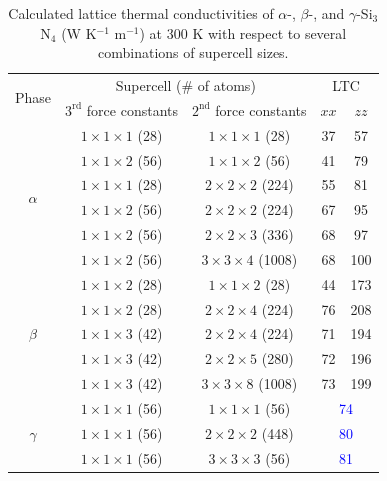 \documentclass[twocolumn,amsmath,amssymb,a4paper,prb,superscriptaddress,floatfix]{revtex4-1}
\begin{document}
\begin{table}[ht]
        \caption{\label{table:LTC} Calculated lattice thermal conductivities
 of $\alpha$-, $\beta$-, and $\gamma$-Si$_3$N$_4$
 (W K$^{-1}$ m$^{-1}$) at 300 K with respect to several combinations of
 supercell sizes.}
 \begin{ruledtabular}
  \begin{tabular}{ccccc}
   \multirow{2}{*}{Phase}
   & \multicolumn{2}{c}{Supercell (\# of atoms)} &
   \multicolumn{2}{c}{LTC} \\
   \cline{2-5}
   & $3^\text{rd}$ force constants & $2^\text{nd}$ force constants & $xx$ & $zz$ \\
   \hline
   \multirow{6}{*}{$\alpha$}
   & $1\times 1\times 1$ (28) & $1\times
   1\times 1$ (28) & 37 &   57 \\
   & $1\times 1\times 2$ (56) & $1\times
   1\times 2$ (56) & 41 &   79 \\
   & $1\times 1\times 1$ (28) & $2\times
   2\times 2$ (224) & 55 &   81 \\
   & $1\times 1\times 2$ (56) & $2\times
   2\times 2$ (224) & 67 &   95 \\
   & $1\times 1\times 2$ (56) & $2\times
   2\times 3$ (336) & 68 &  97 \\
   & $1\times 1\times 2$ (56) & $3\times
   3\times 4$ (1008) & 68 &  100 \\
   \hline
   \multirow{5}{*}{$\beta$}
   & $1\times 1\times 2$ (28) & $1\times
   1\times 2$ (28) & 44 & 173 \\
   & $1\times 1\times 2$ (28) & $2\times
   2\times 4$ (224) & 76 &  208 \\
   & $1\times 1\times 3$ (42) & $2\times
   2\times 4$ (224) & 71 & 194 \\
   & $1\times 1\times 3$ (42) & $2\times
   2\times 5$ (280) & 72 & 196 \\
   & $1\times 1\times 3$ (42) & $3\times
   3\times 8$ (1008) & 73 & 199 \\
   \hline
   \multirow{3}{*}{$\gamma$}
   & $1\times 1\times 1$ (56) & $1\times
   1\times 1$ (56) & \multicolumn{2}{c}{\textcolor{blue}{74}} \\
   & $1\times 1\times 1$ (56) & $2\times
   2\times 2$ (448) & \multicolumn{2}{c}{\textcolor{blue}{80}} \\
   & $1\times 1\times 1$ (56) & $3\times
   3\times 3$ (56) & \multicolumn{2}{c}{\textcolor{blue}{81}} \\
  \end{tabular}
 \end{ruledtabular}
\end{table}
\end{document}
